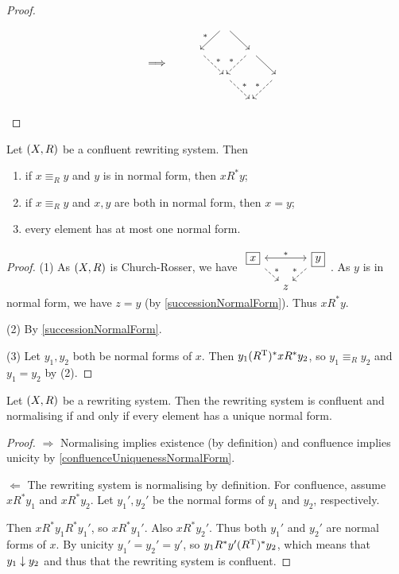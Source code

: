 \begin{proof}
\begin{align*}
\qquad&\implies\qquad \begin{tikzcd}[column sep=1.5em, row sep=1.5em, ampersand replacement=\&]
{} \& \arrow[dl, swap, "{*}"] {} \arrow[dr] \& {} \& {} \\
{} \arrow[dr, dashed, "{*}"] \& {} \& \arrow[dl, dashed, swap, "{*}"] \arrow[dr] {} \& {} \\
{} \& {} \arrow[dr, dashed, "{*}"] \& {} \& {} \arrow[dl, dashed, swap, "{*}"] \\
{} \& {} \& {} \& {}
\end{tikzcd}
\end{align*}
\end{proof}
\begin{corollary} \label{confluenceUniquenessNormalForm}
Let $\sSet{X,R}$ be a confluent rewriting system. Then
\begin{enumerate}
\item if $x\equiv_R y$ and $y$ is in normal form, then $xR^*y$;
\item if $x\equiv_R y$ and $x, y$ are both in normal form, then $x = y$;
\item every element has at most one normal form.
\end{enumerate}
\end{corollary}
\begin{proof}
(1) As $\sSet{X,R}$ is Church-Rosser, we have $\begin{tikzcd}[column sep=small, row sep=small]
\boxed{x} \arrow[rr, leftrightarrow, "{*}"] \arrow[dr, dashed, "{*}"] &{}& \boxed{y} \arrow[dl, dashed, swap, "{*}"] \\
{} & {z} & {}
\end{tikzcd}$. As $y$ is in normal form, we have $z = y$ (by \ref{successionNormalForm}). Thus $xR^*y$.

(2) By \ref{successionNormalForm}.

(3) Let $y_1, y_2$ both be normal forms of $x$. Then $y_1 (R^{\mathrm{T}})^* x R^* y_2$, so $y_1 \equiv_R y_2$ and $y_1 = y_2$ by (2).
\end{proof}

\begin{proposition}
Let $\sSet{X,R}$ be a rewriting system. Then the rewriting system is confluent and normalising \textup{if and only if} every element has a unique normal form.
\end{proposition}
\begin{proof}
$\boxed{\Rightarrow}$ Normalising implies existence (by definition) and confluence implies unicity by \ref{confluenceUniquenessNormalForm}.

$\boxed{\Leftarrow}$ The rewriting system is normalising by definition. For confluence, assume $x R^* y_1$ and $xR^*y_2$. Let $y_1',y_2'$ be the normal forms of $y_1$ and $y_2$, respectively.

Then $xR^*y_1 R^*y_1'$, so $xR^*y_1'$. Also $xR^*y_2'$. Thus both $y_1'$ and $y_2'$ are normal forms of $x$. By unicity $y_1' = y_2' = y'$, so $y_1 R^* y' (R^{\mathrm{T}})^* y_2$, which means that $y_1 \mathrel{\downarrow} y_2$ and thus that the rewriting system is confluent.
\end{proof}

